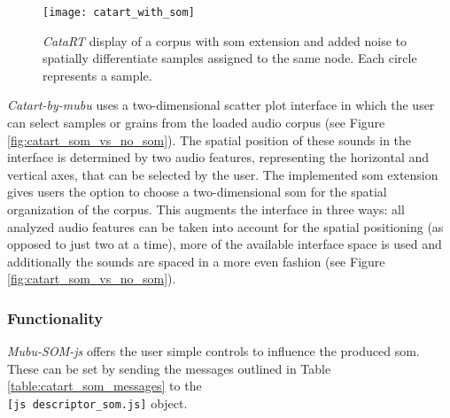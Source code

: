 \begin{figure}[!htb]
  \centering
  \texttt{[image: catart\_with\_som]}
  \caption[\textit{CataRT}: \gls{som} with added noise ]{\textit{CataRT}
  display of a corpus with \gls{som} extension and added noise to
  spatially differentiate samples assigned to the same node. Each circle
  represents a sample.}
  \label{fig:catart_with_som_noise}
\end{figure}


\textit{Catart-by-mubu} uses a
two-dimensional scatter plot interface in which the user can select samples or
grains from the loaded audio corpus (see Figure \ref{fig:catart_som_vs_no_som}).
The spatial position of these sounds in the interface is determined by two audio
features, representing the horizontal and vertical axes, that can be selected by
the user.
The implemented \gls{som} extension gives users the option to choose a
two-dimensional \gls{som} for the spatial organization of the corpus. This
augments the interface in three ways: all analyzed audio features can be
taken into account for the spatial positioning (as opposed to just two at a
time), more of the available interface space is used and additionally the sounds
are spaced in a more even fashion (see Figure \ref{fig:catart_som_vs_no_som}).

\subsubsection{Functionality}
\label{subsubec:mubu-som_functionality}
\textit{Mubu-SOM-js} offers the user simple controls to influence the produced
\gls{som}. These can be set by sending the messages outlined in Table
\ref{table:catart_som_messages} to the \\ \texttt{[js descriptor\_som.js]}
object.

\pagebreak

